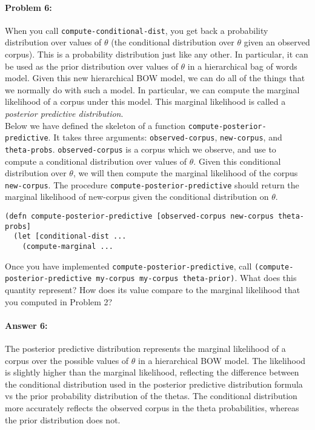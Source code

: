 \documentclass[10pt]{article}
\begin{document}
\hrulefill
\paragraph{Problem 6:}
 
When you call \texttt{compute-conditional-dist}, you get back a
probability distribution over values of $\theta$ (the conditional
distribution over $\theta$ given an observed corpus). This is a
probability distribution just like any other. In particular, it can be
used as the prior distribution over values of $\theta$ in a
hierarchical bag of words model. Given this new hierarchical BOW
model, we can do all of the things that we normally do with such a
model. In particular, we can compute the marginal likelihood of a
corpus under this model. This marginal likelihood is called a
\emph{posterior predictive distribution}.
\\

\noindent Below we have defined the skeleton of a function
\texttt{compute-posterior-predictive}. It takes three arguments:
\texttt{observed-corpus}, \texttt{new-corpus}, and
\texttt{theta-probs}. \texttt{observed-corpus} is a corpus which we
observe, and use to compute a conditional distribution over values of
$\theta$. Given this conditional distribution over $\theta$, we will
then compute the marginal likelihood of the corpus
\texttt{new-corpus}. The procedure
\texttt{compute-posterior-predictive} should return the marginal
likelihood of new-corpus given the conditional distribution on
$\theta$.

\begin{lstlisting}
(defn compute-posterior-predictive [observed-corpus new-corpus theta-probs]
  (let [conditional-dist ...
    (compute-marginal ...
\end{lstlisting}

\noindent Once you have implemented
\texttt{compute-posterior-predictive}, call
\texttt{(compute-posterior-predictive my-corpus my-corpus
  theta-prior)}. What does this quantity represent? How does its value
compare to the marginal likelihood that you computed in Problem 2?

\paragraph{Answer 6:} The posterior predictive distribution represents the marginal likelihood of a corpus over the possible values of $\theta$ in a hierarchical BOW model. The likelihood is slightly higher than the marginal likelihood, reflecting the difference between the conditional distribution used in the posterior predictive distribution formula vs the prior probability distribution of the thetas. The conditional distribution more accurately reflects the observed corpus in the theta probabilities, whereas the prior distribution does not. 
\end{document}
